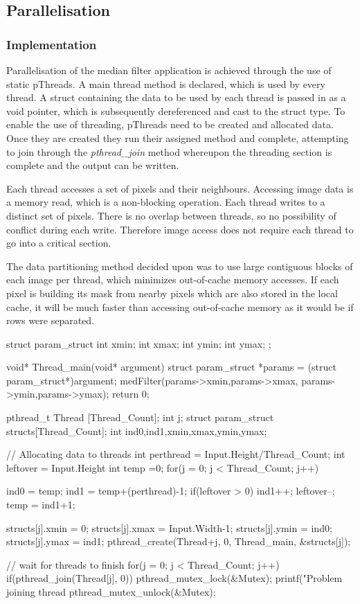\subsection{Parallelisation}
\subsubsection{Implementation}
Parallelisation of the median filter application is achieved through the use of static pThreads. A main thread method is declared, which is used by every thread. A struct containing the data to be used by each thread is passed in as a void pointer, which is subsequently dereferenced and cast to the struct type. To enable the use of threading, pThreads need to be created and allocated data. Once they are created they run their assigned method and complete, attempting to join through the \textit{pthread\_join} method whereupon the threading section is complete and the output can be written. 

Each thread accesses a set of pixels and their neighbours. Accessing image data is a memory read, which is a non-blocking operation. Each thread writes to a distinct set of pixels. There is no overlap between threads, so no possibility of conflict during each write. Therefore image access does not require each thread to go into a critical section.

The data partitioning method decided upon was to use large contiguous blocks of each image per thread, which minimizes out-of-cache memory accesses. If each pixel is building its mask from nearby pixels which are also stored in the local cache, it will be much faster than accessing out-of-cache memory as it would be if rows were separated.

\begin{Cpp}
struct param_struct{
  int xmin;
  int xmax;
  int ymin;
  int ymax;
};

void* Thread_main(void* argument){  
  struct param_struct *params = (struct param_struct*)argument;
  medFilter(params->xmin,params->xmax,
            params->ymin,params->ymax);
  return 0;}
\end{Cpp}
\begin{Cpp}  
pthread_t Thread   [Thread_Count];
int j;  
struct param_struct structs[Thread_Count];
int ind0,ind1,xmin,xmax,ymin,ymax;

// Allocating data to threads  
int perthread = Input.Height/Thread_Count;
int leftover = Input.Height%
int temp =0;
for(j = 0; j < Thread_Count; j++){
  ind0 = temp;
  ind1 = temp+(perthread)-1;
  if(leftover > 0){
    ind1++;
    leftover--;}
  temp = ind1+1;  
  
  structs[j].xmin = 0;
  structs[j].xmax = Input.Width-1;
  structs[j].ymin = ind0;
  structs[j].ymax = ind1;
  pthread_create(Thread+j, 0, Thread_main, &structs[j]);
}

// wait for threads to finish
for(j = 0; j < Thread_Count; j++){
  if(pthread_join(Thread[j], 0)){
    pthread_mutex_lock(&Mutex);
    printf("Problem joining thread %
    pthread_mutex_unlock(&Mutex);}
}

\end{Cpp}

